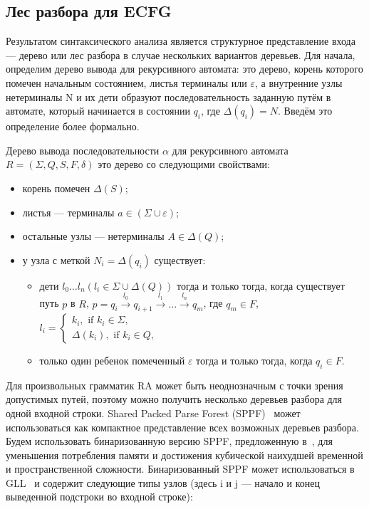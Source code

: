 \subsection{Лес разбора для ECFG}
Результатом синтаксического анализа является структурное представление 
входа --- дерево или лес разбора в случае нескольких вариантов деревьев.
Для начала, определим дерево вывода для рекурсивного автомата: 
это дерево, корень которого помечен начальным состоянием, листья терминалы или $\varepsilon$,
а внутренние узлы нетерминалы N и их
дети образуют последовательность заданную путём в автомате, который начинается в 
состоянии $q_i$, где $ \Delta(q_i) = N $. Введём это определение более формально.

\begin{mydef}
	
	Дерево вывода последовательности $\alpha$ для рекурсивного автомата $R=(\Sigma, Q, S, F, \delta)$ это дерево со следующими свойствами:
	
	\begin{itemize}
		\item корень помечен $\Delta(S)$;
		\item листья --- терминалы $a\in (\Sigma \cup \varepsilon)$;
		\item остальные узлы --- нетерминалы $A\in \Delta(Q)$;
		\item у узла с меткой $N_i = \Delta(q_i)$ существует:
		\begin{itemize}
			\item 
			дети $l_0 \dots l_n (l_i \in \Sigma \cup \Delta(Q))$ тогда и только тогда,
			когда существует путь $p$ в $R$, $p = q_i \xrightarrow[]{l_0} q_{i+1} \xrightarrow[]{l_1} \dots \xrightarrow{l_n} q_m$, где
			$q_m \in F$, $l_i = 
			\left\{
			\begin{matrix}
			k_i, \text{ if } k_i \in \Sigma,\\
			\Delta(k_i), \text{ if } k_i \in Q,
			\end{matrix}
			\right.
			$
			\item только один ребенок помеченный $\varepsilon$ тогда и только тогда,
			когда $ q_i \in F $.
		\end{itemize}
	\end{itemize}
\end{mydef}
Для произвольных грамматик RA может быть неоднозначным с точки зрения допустимых путей,
поэтому можно получить несколько деревьев разбора для одной входной строки.
Shared Packed Parse Forest (SPPF)~\cite{SPPF} может использоваться как компактное
представление всех возможных деревьев разбора. Будем использовать бинаризованную версию SPPF,
предложенную в~\cite{brnglr}, для уменьшения потребления памяти и достижения кубической
наихудшей временной и пространственной сложности. Бинаризованный SPPF может использоваться
в GLL~\cite{scott2013gll} и содержит следующие типы узлов (здесь i и j --- начало и конец выведенной подстроки во входной строке):

